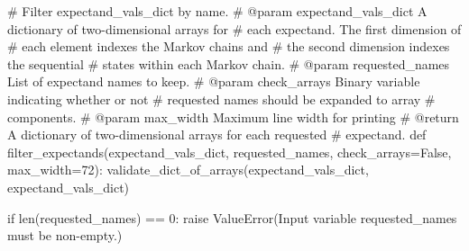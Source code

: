 \documentclass[
  letterpaper,
  DIV=11,
  numbers=noendperiod]{scrartcl}
\newenvironment{Shaded}{\begin{snugshade}}{\end{snugshade}}
\newcommand{\BuiltInTok}[1]{\textcolor[rgb]{0.00,0.23,0.31}{#1}}
\newcommand{\CommentTok}[1]{\textcolor[rgb]{0.37,0.37,0.37}{#1}}
\newcommand{\ControlFlowTok}[1]{\textcolor[rgb]{0.00,0.23,0.31}{#1}}
\newcommand{\DecValTok}[1]{\textcolor[rgb]{0.68,0.00,0.00}{#1}}
\newcommand{\KeywordTok}[1]{\textcolor[rgb]{0.00,0.23,0.31}{#1}}
\newcommand{\NormalTok}[1]{\textcolor[rgb]{0.00,0.23,0.31}{#1}}
\newcommand{\OperatorTok}[1]{\textcolor[rgb]{0.37,0.37,0.37}{#1}}
\newcommand{\PreprocessorTok}[1]{\textcolor[rgb]{0.68,0.00,0.00}{#1}}
\newcommand{\StringTok}[1]{\textcolor[rgb]{0.13,0.47,0.30}{#1}}
\newcommand{\VariableTok}[1]{\textcolor[rgb]{0.07,0.07,0.07}{#1}}
\begin{document}
\begin{Shaded}
\begin{Highlighting}[]
\CommentTok{\# Filter \textasciigrave{}expectand\_vals\_dict\textasciigrave{} by name.}
\CommentTok{\# @param expectand\_vals\_dict A dictionary of two{-}dimensional arrays for}
\CommentTok{\#                            each expectand.  The first dimension of}
\CommentTok{\#                            each element indexes the Markov chains and}
\CommentTok{\#                            the second dimension indexes the sequential}
\CommentTok{\#                            states within each Markov chain.}
\CommentTok{\# @param requested\_names List of expectand names to keep.}
\CommentTok{\# @param check\_arrays Binary variable indicating whether or not}
\CommentTok{\#                     requested names should be expanded to array}
\CommentTok{\#                     components.}
\CommentTok{\# @param max\_width Maximum line width for printing}
\CommentTok{\# @return A dictionary of two{-}dimensional arrays for each requested}
\CommentTok{\#         expectand.}
\KeywordTok{def}\NormalTok{ filter\_expectands(expectand\_vals\_dict, requested\_names,}
\NormalTok{                      check\_arrays}\OperatorTok{=}\VariableTok{False}\NormalTok{, max\_width}\OperatorTok{=}\DecValTok{72}\NormalTok{):}
\NormalTok{  validate\_dict\_of\_arrays(expectand\_vals\_dict, }\StringTok{\textquotesingle{}expectand\_vals\_dict\textquotesingle{}}\NormalTok{)}

  \ControlFlowTok{if} \BuiltInTok{len}\NormalTok{(requested\_names) }\OperatorTok{==} \DecValTok{0}\NormalTok{:}
    \ControlFlowTok{raise} \PreprocessorTok{ValueError}\NormalTok{(}\StringTok{\textquotesingle{}Input variable \textasciigrave{}requested\_names\textasciigrave{} \textquotesingle{}}
                     \StringTok{\textquotesingle{}must be non{-}empty.\textquotesingle{}}\NormalTok{)}
  

\end{Highlighting}
\end{Shaded}
\end{document}

